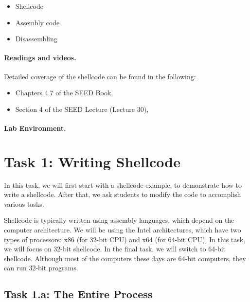 \begin{itemize}[noitemsep]
\item Shellcode
\item Assembly code
\item Disassembling 
\end{itemize}


\paragraph{Readings and videos.}
Detailed coverage of the shellcode can be found in the following:

\begin{itemize}
\item Chapters 4.7 of the SEED Book, \seedbook
\item Section 4 of the SEED Lecture (Lecture 30), \seedcsvideo
\end{itemize}


\paragraph{Lab Environment.} 
\seedenvironment



\section{Task 1: Writing Shellcode}


In this task, we will first start with a shellcode example,
to demonstrate how to write a shellcode. After that, we ask
students to modify the code to accomplish various tasks. 

Shellcode is typically written using assembly languages, which
depend on the computer architecture. We will be using 
the Intel architectures, which have two types of processors:
x86 (for 32-bit CPU) and x64 (for 64-bit CPU). In this 
task, we will focus on 32-bit shellcode. In the final task,
we will switch to 64-bit shellcode.  
Although most of the computers these days are 64-bit computers,
they can run 32-bit programs. 


\subsection{Task 1.a: The Entire Process}

